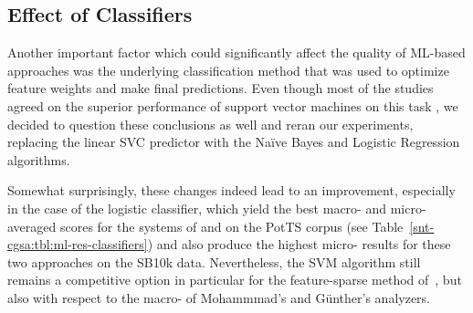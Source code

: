\subsection{Effect of Classifiers}\label{subsec:cgsa:ml-methods:classifiers-analysis}

Another important factor which could significantly affect the quality
of ML-based approaches was the underlying classification method that
was used to optimize feature weights and make final predictions.  Even
though most of the studies agreed on the superior performance of
support vector machines on this task \cite[see
][]{Pang:02,Gamon:04,Mohammad:13}, we decided to question these
conclusions as well and reran our experiments, replacing the linear
SVC predictor with the Na\"ive Bayes and Logistic Regression
algorithms.

Somewhat surprisingly, these changes indeed lead to an improvement,
especially in the case of the logistic classifier, which yield the
best macro- and micro-averaged scores for the systems of
\citet{Mohammad:13} and \citet{Guenther:14} on the PotTS corpus (see
Table~\ref{snt-cgsa:tbl:ml-res-classifiers}) and also produce the
highest micro-\F{} results for these two approaches on the SB10k data.
Nevertheless, the SVM algorithm still remains a competitive option in
particular for the feature-sparse method of~\citet{Gamon:04}, but also
with respect to the macro-\F{} of Mohammmad's and G\"unther's
analyzers.

